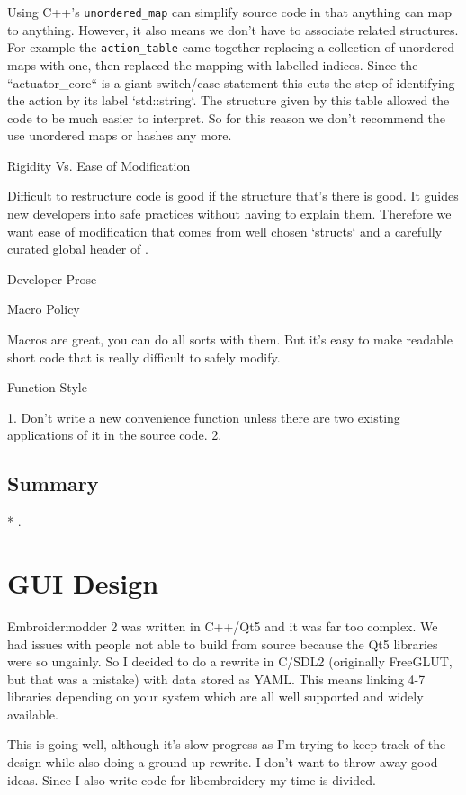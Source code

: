 \documentclass[a4paper]{report}
\begin{document}
Using C++'s \texttt{unordered\_map} can simplify source code in that anything can
map to anything. However, it also means we don't have to associate related structures.
For example the \texttt{action\_table} came together replacing a collection of unordered maps
with one, then replaced the mapping with labelled indices. Since the ``actuator\_core``
is a giant switch/case statement this cuts the step of identifying the action by its
label `std::string`.
The structure given by this table allowed the code to be much
easier to interpret. So for this reason we don't recommend the use unordered maps or hashes any more.

Rigidity Vs. Ease of Modification
~~~~~~~~~~~~~~~~~~~~~~~~~~~~~~~~~

Difficult to restructure code is good if the structure that's there is good.
It guides new developers into safe practices without having to explain them.
Therefore we want ease of modification that comes from well chosen `structs`
and a carefully curated global header of .

Developer Prose
~~~~~~~~~~~~~~~

Macro Policy
~~~~~~~~~~~~

Macros are great, you can do all sorts with them. But it's easy to make readable
short code that is really difficult to safely modify.

Function Style
~~~~~~~~~~~~~~

1. Don't write a new convenience function unless there are two
existing applications of it in the source code.
2. 

\subsection{Summary}

* .

\section{GUI Design}

Embroidermodder 2 was written in C++/Qt5 and it was far too complex. We had
issues with people not able to build from source because the Qt5 libraries were
so ungainly. So I decided to do a rewrite in C/SDL2 (originally FreeGLUT, but
that was a mistake) with data stored as YAML. This means linking 4-7 libraries
depending on your system which are all well supported and widely available.

This is going well, although it's slow progress as I'm trying to keep track of
the design while also doing a ground up rewrite. I don't want to throw away good
ideas. Since I also write code for libembroidery my time is divided.
\end{document}
